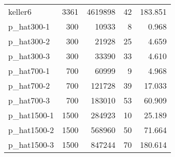 \begin{table}[!htbp]
{\begin{tabular}{|l|r|r|r|r|}
keller6 & 3361 & 4619898 & 42 & 183.851 \\
p_hat300-1 & 300 & 10933 & 8 & 0.968 \\
p_hat300-2 & 300 & 21928 & 25 & 4.659 \\
p_hat300-3 & 300 & 33390 & 33 & 4.610 \\
p_hat700-1 & 700 & 60999 & 9 & 4.968 \\
p_hat700-2 & 700 & 121728 & 39 & 17.033 \\
p_hat700-3 & 700 & 183010 & 53 & 60.909 \\
p_hat1500-1 & 1500 & 284923 & 10 & 25.189 \\
p_hat1500-2 & 1500 & 568960 & 50 & 71.664 \\
p_hat1500-3 & 1500 & 847244 & 70 & 180.614 \\
\hline
\end{tabular}%
}
\end{table}
